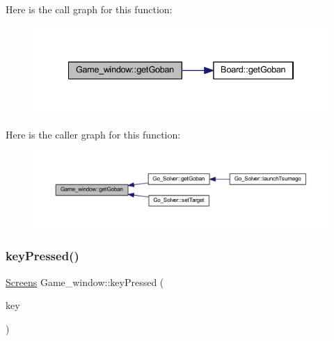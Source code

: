 Here is the call graph for this function\+:
\nopagebreak
\begin{figure}[H]
\begin{center}
\leavevmode
\includegraphics[width=334pt]{class_game__window_a782f1aca3d28de1350375b10459073d4_cgraph}
\end{center}
\end{figure}
Here is the caller graph for this function\+:
\nopagebreak
\begin{figure}[H]
\begin{center}
\leavevmode
\includegraphics[width=350pt]{class_game__window_a782f1aca3d28de1350375b10459073d4_icgraph}
\end{center}
\end{figure}
\mbox{\label{class_game__window_a72304de2044c29f1373037bd818f674f}} 
\subsubsection{\texorpdfstring{key\+Pressed()}{keyPressed()}}
{\footnotesize\ttfamily \hyperlink{_globals_8h_a3d5776bab98402b03be09156bacf4f68}{Screens} Game\+\_\+window\+::key\+Pressed (\begin{DoxyParamCaption}\item[{const sf\+::\+Event\+::\+Key\+Event \&}]{key }\end{DoxyParamCaption})}

